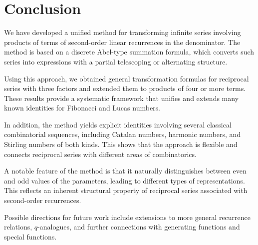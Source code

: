 \documentclass[12pt,reqno]{article}
\begin{document}
\section{Conclusion}

We have developed a unified method for transforming infinite series involving products of terms of second-order linear recurrences in the denominator. The method is based on a discrete Abel-type summation formula, which converts such series into expressions with a partial telescoping or alternating structure.

Using this approach, we obtained general transformation formulas for reciprocal series with three factors and extended them to products of four or more terms. These results provide a systematic framework that unifies and extends many known identities for Fibonacci and Lucas numbers.

In addition, the method yields explicit identities involving several classical combinatorial sequences, including Catalan numbers, harmonic numbers, and Stirling numbers of both kinds. This shows that the approach is flexible and connects reciprocal series with different areas of combinatorics.

A notable feature of the method is that it naturally distinguishes between even and odd values of the parameters, leading to different types of representations. This reflects an inherent structural property of reciprocal series associated with second-order recurrences.

Possible directions for future work include extensions to more general recurrence relations, $q$-analogues, and further connections with generating functions and special functions.
\end{document}
